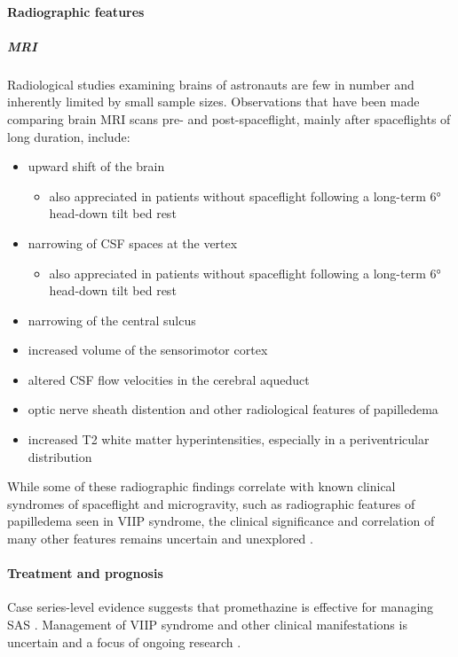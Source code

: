 \paragraph{Radiographic features}

\subparagraph{MRI}

Radiological studies examining brains of astronauts are few in number and inherently limited by small sample sizes. Observations that have been made comparing brain MRI scans pre- and post-spaceflight, mainly after spaceflights of long duration, include:

\begin{itemize}
	\tightlist
	\item
	upward shift of the brain 
	
	\begin{itemize}
		\tightlist
		\item
		also appreciated in patients without spaceflight following a long-term 6° head-down tilt bed rest 
	\end{itemize}
	\item
	narrowing of CSF spaces at the vertex 
	
	\begin{itemize}
		\tightlist
		\item
		also appreciated in patients without spaceflight following a long-term 6° head-down tilt bed rest 
	\end{itemize}
	\item
	narrowing of the central sulcus
	\item
	increased volume of the sensorimotor cortex 
	\item
	altered CSF flow velocities in the cerebral aqueduct 
	\item
	optic nerve sheath distention and other radiological features of papilledema
	\item
	increased T2 white matter hyperintensities, especially in a periventricular distribution 
\end{itemize}

While some of these radiographic findings correlate with known clinical syndromes of spaceflight and microgravity, such as radiographic features of papilledema seen in VIIP syndrome, the clinical significance and correlation of many other features remains uncertain and unexplored .

\paragraph{Treatment and prognosis}

Case series-level evidence suggests that promethazine is effective for managing SAS . Management of VIIP syndrome and other clinical manifestations is uncertain and a focus of ongoing research .